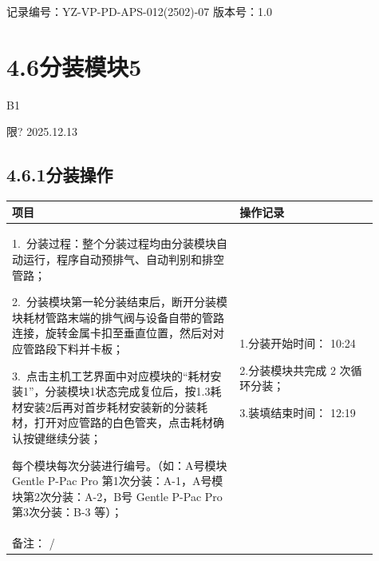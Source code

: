 \documentclass[UTF8,10pt,a4paper,fontset=fandol]{ctexart}
\newcommand{\fieldvalue}[1]{#1}
\newcommand{\handwritten}[1]{#1}
\begin{document}
记录编号：YZ-VP-PD-APS-012(2502)-07 \quad 版本号：1.0

\section*{4.6\quad 分装模块5}

\handwritten{B1}

\handwritten{限?}\quad
\handwritten{2025.12.13}

\subsection*{4.6.1\quad 分装操作}

\begin{center}
\small
\begin{tabular}{|p{0.57\linewidth}|p{0.34\linewidth}|}
\hline
项目 & 操作记录 \\
\hline
\begin{minipage}[t]{\linewidth}
1.\ 分装过程：整个分装过程均由分装模块自动运行，程序自动预排气、自动判别和排空管路；

2.\ 分装模块第一轮分装结束后，断开分装模块耗材管路末端的排气阀与设备自带的管路连接，旋转金属卡扣至垂直位置，然后对对应管路段下料并卡板；

3.\ 点击主机工艺界面中对应模块的“耗材安装1”，分装模块1状态完成复位后，按1.3耗材安装2后再对首步耗材安装新的分装耗材，打开对应管路的白色管夹，点击耗材确认按键继续分装；

每个模块每次分装进行编号。（如：A号模块 Gentle P-Pac Pro 第1次分装：A-1，A号模块第2次分装：A-2，B号 Gentle P-Pac Pro 第3次分装：B-3 等）；
\end{minipage}
&
\begin{minipage}[t]{\linewidth}
1.分装开始时间：
\fieldvalue{\handwritten{10:24}}

2.分装模块共完成
\fieldvalue{\handwritten{2}}
次循环分装；

3.装填结束时间：
\fieldvalue{\handwritten{12:19}}
\end{minipage}
\\
\hline
备注：
\fieldvalue{\handwritten{/}}
&
\\
\hline
\end{tabular}
\end{center}
\end{document}
